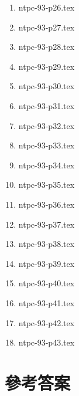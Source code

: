 \documentclass[12pt,a4paper]{report}
\begin{document}
\begin{CJK}{UTF8}{bkai}
\begin{enumerate}
\item {ntpc-93-p26.tex}
\item {ntpc-93-p27.tex}
\item {ntpc-93-p28.tex}
\item {ntpc-93-p29.tex}
\item {ntpc-93-p30.tex}
\item {ntpc-93-p31.tex}
\item {ntpc-93-p32.tex}
\item {ntpc-93-p33.tex}
\item {ntpc-93-p34.tex}
\item {ntpc-93-p35.tex}
\item {ntpc-93-p36.tex}
\item {ntpc-93-p37.tex}
\item {ntpc-93-p38.tex}
\item {ntpc-93-p39.tex}
\item {ntpc-93-p40.tex}
\item {ntpc-93-p41.tex}
\item {ntpc-93-p42.tex}
\item {ntpc-93-p43.tex}
\end{enumerate}

\newpage

\section*{參考答案}


\end{CJK}
\end{document}
